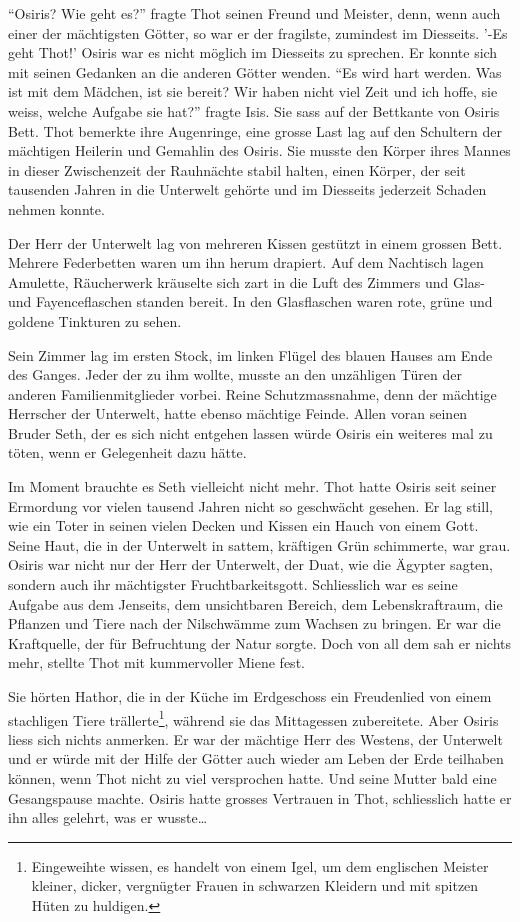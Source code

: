 \documentclass[11pt,titlepage,a5paper]{book}
\begin{document}
"`Osiris? Wie geht es?"' fragte Thot seinen Freund und Meister, denn, wenn auch einer der mächtigsten Götter, so war er der fragilste, zumindest im Diesseits. '-Es geht Thot!' Osiris war es nicht möglich im Diesseits zu sprechen. Er konnte sich mit seinen Gedanken an die anderen Götter wenden.  "`Es wird hart werden. Was ist mit dem Mädchen, ist sie bereit? Wir haben nicht viel Zeit und ich hoffe, sie weiss, welche Aufgabe sie hat?"'  fragte Isis. Sie sass auf der Bettkante von Osiris Bett. Thot bemerkte ihre Augenringe, eine grosse Last lag auf den Schultern der mächtigen Heilerin und Gemahlin des Osiris. Sie musste den Körper ihres Mannes in dieser Zwischenzeit der Rauhnächte stabil halten, einen Körper, der seit tausenden Jahren in die Unterwelt gehörte und im Diesseits jederzeit Schaden nehmen konnte. 

Der Herr der Unterwelt lag von mehreren Kissen gestützt in einem grossen Bett. Mehrere Federbetten waren um ihn herum drapiert. Auf dem Nachtisch lagen Amulette, Räucherwerk kräuselte sich zart in die Luft des Zimmers und Glas- und Fayenceflaschen standen bereit. In den Glasflaschen waren rote, grüne und goldene Tinkturen zu sehen. 

Sein Zimmer lag im ersten Stock, im linken Flügel des blauen Hauses am Ende des Ganges. Jeder der zu ihm wollte, musste an den unzähligen Türen der anderen Familienmitglieder vorbei. Reine Schutzmassnahme, denn der mächtige Herrscher der Unterwelt, hatte ebenso mächtige Feinde. Allen voran seinen Bruder Seth, der es sich nicht entgehen lassen würde Osiris ein weiteres mal zu töten, wenn er Gelegenheit dazu hätte. 

Im Moment brauchte es Seth vielleicht nicht mehr. Thot hatte Osiris seit seiner Ermordung vor vielen tausend Jahren nicht so geschwächt gesehen. Er lag still, wie ein Toter in seinen vielen Decken und Kissen ein Hauch von einem Gott. Seine Haut, die in der Unterwelt in sattem, kräftigen Grün schimmerte, war grau. Osiris war nicht nur der Herr der Unterwelt, der Duat, wie die Ägypter sagten, sondern auch ihr mächtigster Fruchtbarkeitsgott. Schliesslich war es seine Aufgabe aus dem Jenseits, dem unsichtbaren Bereich, dem Lebenskraftraum, die Pflanzen und Tiere nach der Nilschwämme zum Wachsen zu bringen. Er war die Kraftquelle, der für Befruchtung der Natur sorgte. Doch von all dem sah er nichts mehr, stellte Thot mit kummervoller Miene fest.

Sie hörten Hathor, die in der Küche im Erdgeschoss ein Freudenlied von einem stachligen Tiere trällerte\footnote{Eingeweihte wissen, es handelt von einem Igel, um dem englischen Meister kleiner, dicker, vergnügter Frauen in schwarzen Kleidern und mit spitzen Hüten zu huldigen.}, während sie das Mittagessen zubereitete. Aber Osiris liess sich nichts anmerken. Er war der mächtige Herr des Westens, der Unterwelt und er würde mit der Hilfe der Götter auch wieder am Leben der Erde teilhaben können, wenn Thot nicht zu viel versprochen hatte. Und seine Mutter bald eine Gesangspause machte. Osiris hatte grosses Vertrauen in Thot, schliesslich hatte er ihn alles gelehrt, was er wusste\dots
 
\end{document}
